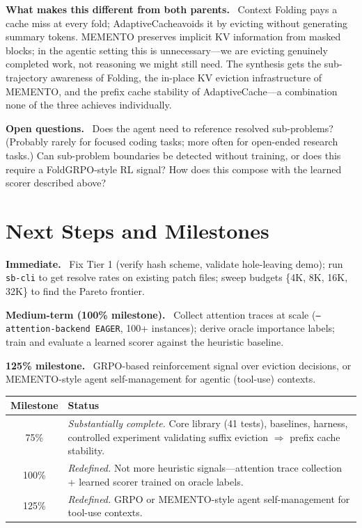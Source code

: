 \documentclass[letterpaper,twocolumn,10pt]{article}
\newcommand{\sysname}{AdaptiveCache}
\newcommand{\para}[1]{\smallskip\noindent\textbf{#1.}\ }
\begin{document}
\para{What makes this different from both parents}
Context Folding pays a cache miss at every fold; \sysname avoids it by
evicting without generating summary tokens.
MEMENTO preserves implicit KV information from masked blocks; in the agentic
setting this is unnecessary---we are evicting genuinely completed work, not
reasoning we might still need.
The synthesis gets the sub-trajectory awareness of Folding, the in-place
KV eviction infrastructure of MEMENTO, and the prefix cache stability of
\sysname---a combination none of the three achieves individually.

\para{Open questions} Does the agent need to reference resolved
sub-problems? (Probably rarely for focused coding tasks; more often for
open-ended research tasks.) Can sub-problem boundaries be detected without
training, or does this require a FoldGRPO-style RL signal? How does this
compose with the learned scorer described above?

\section{Next Steps and Milestones}

\para{Immediate} Fix Tier 1 (verify hash scheme, validate hole-leaving demo);
run \texttt{sb-cli} to get resolve rates on existing patch files; sweep
budgets \{4K, 8K, 16K, 32K\} to find the Pareto frontier.

\para{Medium-term (100\% milestone)} Collect attention traces at scale
(\texttt{--attention-backend EAGER}, 100+ instances); derive oracle importance
labels; train and evaluate a learned scorer against the heuristic baseline.

\para{125\% milestone} GRPO-based reinforcement signal over eviction
decisions, or MEMENTO-style agent self-management for agentic (tool-use)
contexts.

\begin{table}[h]
\centering\small
\begin{tabular}{cp{5.5cm}}
\toprule
\textbf{Milestone} & \textbf{Status} \\
\midrule
75\%  & \textit{Substantially complete.} Core library (41 tests), baselines,
  harness, controlled experiment validating suffix eviction $\Rightarrow$
  prefix cache stability. \\[3pt]
100\% & \textit{Redefined.} Not more heuristic signals---attention trace
  collection + learned scorer trained on oracle labels. \\[3pt]
125\% & \textit{Redefined.} GRPO or MEMENTO-style agent self-management
  for tool-use contexts. \\
\bottomrule
\end{tabular}
\end{table}
\end{document}
